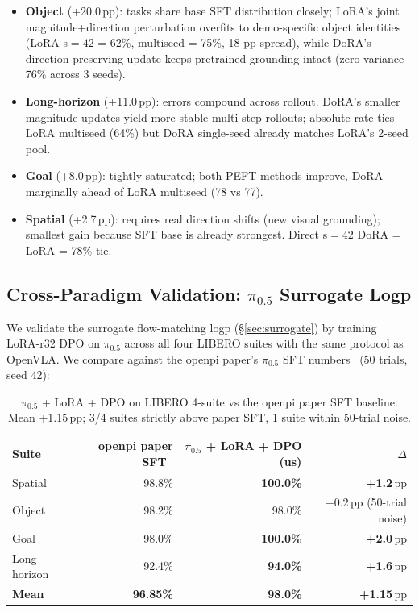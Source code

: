 \documentclass{article}
\begin{document}
\begin{itemize}
  \item \textbf{Object} (+20.0\,pp): tasks share base SFT distribution closely; LoRA's joint magnitude+direction perturbation overfits to demo-specific object identities (LoRA s\(=42\) = 62\%, multiseed = 75\%, 18-pp spread), while DoRA's direction-preserving update keeps pretrained grounding intact (zero-variance 76\% across 3 seeds).
  \item \textbf{Long-horizon} (+11.0\,pp): errors compound across rollout. DoRA's smaller magnitude updates yield more stable multi-step rollouts; absolute rate ties LoRA multiseed (64\%) but DoRA single-seed already matches LoRA's 2-seed pool.
  \item \textbf{Goal} (+8.0\,pp): tightly saturated; both PEFT methods improve, DoRA marginally ahead of LoRA multiseed (78 vs 77).
  \item \textbf{Spatial} (+2.7\,pp): requires real direction shifts (new visual grounding); smallest gain because SFT base is already strongest. Direct s\(=42\) DoRA = LoRA = 78\% tie.
\end{itemize}

\subsection{Cross-Paradigm Validation: \(\pi_{0.5}\) Surrogate Logp}\label{sec:cross-validation}

We validate the surrogate flow-matching logp (\S\ref{sec:surrogate}) by training LoRA-r32 DPO on \(\pi_{0.5}\) across all four LIBERO suites with the same protocol as OpenVLA. We compare against the openpi paper's \(\pi_{0.5}\) SFT numbers~\cite{openpi2025pi05} (50 trials, seed 42):

\begin{table}[ht]
\centering
\caption{\(\pi_{0.5}\) + LoRA + DPO on LIBERO 4-suite vs the openpi paper SFT baseline. Mean +1.15\,pp; 3/4 suites strictly above paper SFT, 1 suite within 50-trial noise.}
\label{tab:pi05-dpo-4suite}
\setlength{\tabcolsep}{5pt}
\begin{tabular}{lrrr}
\toprule
Suite & openpi paper SFT~\cite{openpi2025pi05} & \(\pi_{0.5}\) + LoRA + DPO (us) & \(\Delta\) \\
\midrule
Spatial & 98.8\% & \textbf{100.0\%} & \textbf{+1.2}\,pp \\
Object & 98.2\% & 98.0\% & \(-0.2\)\,pp (50-trial noise) \\
Goal & 98.0\% & \textbf{100.0\%} & \textbf{+2.0}\,pp \\
Long-horizon & 92.4\% & \textbf{94.0\%} & \textbf{+1.6}\,pp \\
\midrule
\textbf{Mean} & \textbf{96.85\%} & \textbf{98.0\%} & \textbf{+1.15}\,pp \\
\bottomrule
\end{tabular}
\end{table}
\end{document}
